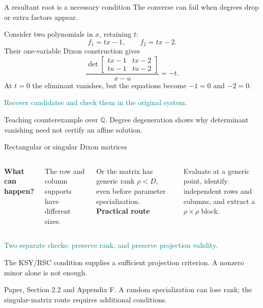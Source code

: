 \documentclass[aspectratio=169,11pt,professionalfonts]{beamer}
\newcommand{\src}[1]{\vfill{\color{Muted}\fontsize{7}{8.5}\selectfont #1\par}}
\newcommand{\lead}[1]{{\color{Teal}\large #1}\par\vspace{3mm}}
\newcommand{\gap}{\par\vspace{3mm}}
\begin{document}
\begin{frame}{A resultant root is a necessary condition}
\lead{The converse can fail when degrees drop or extra factors appear.}
Consider two polynomials in $x$, retaining $t$:
\[f_1=tx-1,\qquad f_2=tx-2.\]
Their one-variable Dixon construction gives
\[\frac{\det\begin{bmatrix}tx-1&tx-2\\tu-1&tu-2\end{bmatrix}}{x-u}=-t.\]
At $t=0$ the eliminant vanishes, but the equations become $-1=0$ and $-2=0$.
\gap\textcolor{Teal}{Recover candidates and check them in the original system.}
\src{Teaching counterexample over $\mathbb Q$. Degree degeneration shows why determinant vanishing need not certify an affine solution.}
\end{frame}

\begin{frame}{Rectangular or singular Dixon matrices}
\begin{columns}[T,onlytextwidth]
\textbf{What can happen?}\gap The row and column supports have different sizes.\gap
Or the matrix has generic rank $\rho<D$, even before parameter specialization.
\textbf{Practical route}\gap Evaluate at a generic point, identify independent rows and columns, and extract a $\rho\times\rho$ block.
\end{columns}\vspace{5mm}
\textcolor{Teal}{Two separate checks: preserve rank, and preserve projection validity.}\gap
The KSY/RSC condition supplies a sufficient projection criterion. A nonzero minor alone is not enough.
\src{Paper, Section 2.2 and Appendix F. A random specialization can lose rank; the singular-matrix route requires additional conditions.}
\end{frame}
\end{document}
